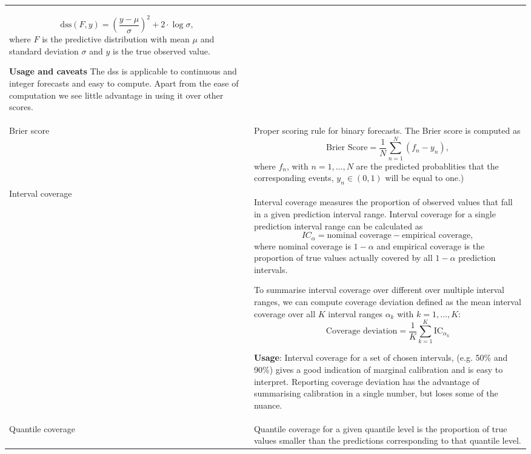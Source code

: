 \documentclass[
]{jss}
\begin{document}
\begin{CodeChunk}
\begin{longtable}[t]{>{\raggedright\arraybackslash}p{1.1in}>{\raggedright\arraybackslash}p{4.625in}}
  $$\text{dss}(F, y) = \left( \frac{y - \mu}{\sigma} \right)^2 + 2 \cdot \log \sigma,$$
  where $F$ is the predictive distribution with mean $\mu$ and standard deviation $\sigma$ and $y$ is the true observed value.

  \textbf{Usage and caveats} The dss is applicable to continuous and integer forecasts and easy to compute. Apart from the ease of computation we see little advantage in using it over other scores.\\
\addlinespace
Brier score & Proper scoring rule for binary forecasts. The Brier score is computed as
  $$\text{Brier Score} = \frac{1}{N} \sum_{n = 1}^{N} (f_n - y_n),$$
  where $f_n$, with $n = 1, \dots, N$ are the predicted probablities that the corresponding events, $y_n \in (0, 1)$ will be equal to one.)

\cellcolor{gray!6}{  \textbf{Usage}: Applicable to all binary forecasts.}\\
\addlinespace
Interval coverage & Interval coverage measures the proportion of observed values that fall in a given prediction interval range. Interval coverage for a single prediction interval range can be calculated as $$IC_{\alpha} = \text{nominal coverage} - \text{empirical coverage},$$
  where nominal coverage is $1 - \alpha$ and empirical coverage is the proportion of true values actually covered by all $1 - \alpha$ prediction intervals.

  To summarise interval coverage over different over multiple interval ranges, we can compute coverage deviation defined as the mean interval coverage over all $K$ interval ranges $\alpha_k$ with $k = 1, \dots, K$:
  $$\text{Coverage deviation} = \frac{1}{K} \sum_{k = 1}^{K} \text{IC}_{\alpha_k}$$

  \textbf{Usage}: Interval coverage for a set of chosen intervals, (e.g. 50\% and 90\%) gives a good indication of marginal calibration and is easy to interpret. Reporting coverage deviation has the advantage of summarising calibration in a single number, but loses some of the nuance.\\
\addlinespace
Quantile coverage & Quantile coverage for a given quantile level is the proportion of true values smaller than the predictions corresponding to that quantile level.


\end{longtable}
\end{CodeChunk}
\end{document}
